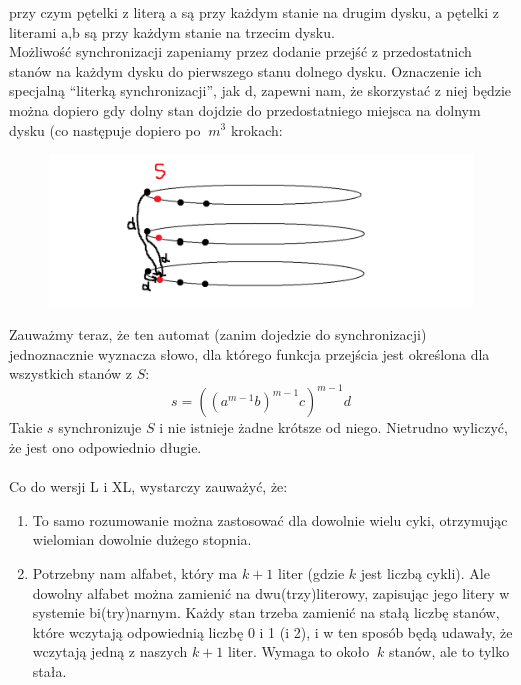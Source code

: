 \documentclass[a4paper,11pt]{article}
\begin{document}
przy czym pętelki z literą a są przy każdym stanie na drugim dysku, a pętelki z literami a,b są przy każdym stanie na trzecim
dysku. \\
Możliwość synchronizacji zapeniamy przez dodanie przejść z przedostatnich stanów na każdym dysku do pierwszego stanu 
dolnego dysku. Oznaczenie ich specjalną ``literką synchronizacji'', jak d, zapewni nam, że skorzystać z niej będzie można
dopiero gdy dolny stan dojdzie do przedostatniego miejsca na dolnym dysku (co następuje dopiero po $~m^3$ krokach: \\
\begin{figure}[h!]
  \centerline{%
    \includegraphics[width=18cm]{zad42_3.png}%
  }%
\end{figure}

Zauważmy teraz, że ten automat (zanim dojedzie do synchronizacji) jednoznacznie wyznacza słowo, dla którego funkcja przejścia 
jest określona dla wszystkich stanów z $S$:
$$
s = ((a^{m-1}b)^{m-1}c)^{m-1}d
$$
Takie $s$ synchronizuje $S$ i nie istnieje żadne krótsze od niego. Nietrudno wyliczyć, że jest ono odpowiednio długie. \\ \\

Co do wersji L i XL, wystarczy zauważyć, że:
\begin{enumerate}
 \item To samo rozumowanie można zastosować dla dowolnie wielu cyki, otrzymując wielomian dowolnie dużego stopnia.
 \item Potrzebny nam alfabet, który ma $k+1$ liter (gdzie $k$ jest liczbą cykli). Ale dowolny alfabet można zamienić na
 dwu(trzy)literowy, zapisując jego litery w systemie bi(try)narnym. Każdy stan trzeba zamienić na stałą liczbę stanów, które 
 wczytają odpowiednią liczbę 0 i 1 (i 2), i w ten sposób będą udawały, że wczytają jedną z naszych $k+1$ liter. Wymaga to około
 $~k$ stanów, ale to tylko stała.
\end{enumerate}
\end{document}
